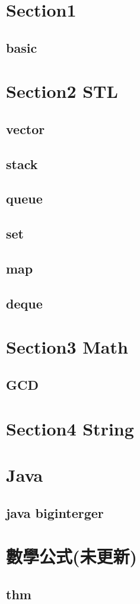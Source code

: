 \section{Section1}
    \subsection{basic}
        
\section{Section2 STL}
    \subsection{vector}
        
    \subsection{stack}
        
    \subsection{queue}
        
    \subsection{set}
        
    \subsection{map}
        
    \subsection{deque}
        
\section{Section3 Math}
    \subsection{GCD}
            
\section{Section4 String}

\section{Java}
    \subsection{java biginterger}
        


\section{數學公式(未更新)}
    \subsection{thm}
        
        
